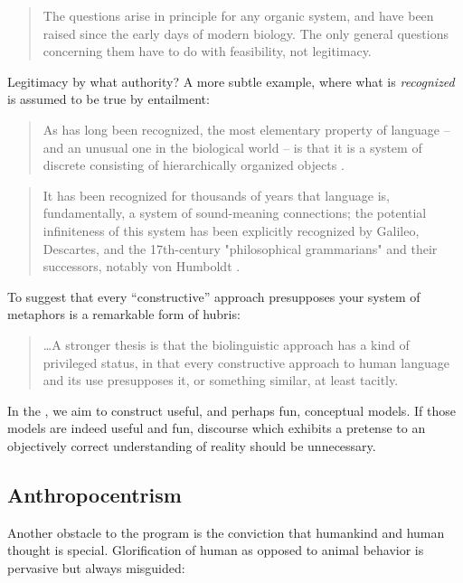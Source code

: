 \begin{quote} 
The questions arise in principle for any organic system, and have been raised since the early days of modern biology. The only general questions concerning them have to do with feasibility, not legitimacy. \citep[133]{Chomsky2008}
\end{quote}

Legitimacy by what authority? A more subtle example, where what is \textit{recognized} is assumed to be true by entailment:

\begin{quote} 
As has long been recognized, the most elementary property of language – and an unusual one in the biological world – is that it is a system of discrete  consisting of hierarchically organized objects \citep[134]{Chomsky2008}.
\end{quote}

\begin{quote} 
It has been recognized for thousands of years that language is, fundamentally, a system of sound-meaning connections; the potential infiniteness of this system has been explicitly recognized by Galileo, Descartes, and the 17th-century "philosophical grammarians" and their successors, notably von Humboldt \citep{HauserEtAl2002}.
\end{quote}

To suggest that every “constructive” approach presupposes your system of metaphors is a remarkable form of hubris:

\begin{quote} 
…A stronger thesis is that the biolinguistic approach has a kind of privileged status, in that every constructive approach to human language and its use presupposes it, or something similar, at least tacitly. \citep{Chomsky2001a}
\end{quote}

  In the , we aim to construct useful, and perhaps fun, conceptual models. If those models are indeed useful and fun, discourse which exhibits a pretense to an objectively correct understanding of reality should be unnecessary.

\subsection{Anthropocentrism}

Another obstacle to the  program is the conviction that humankind and human thought is special. Glorification of human as opposed to animal behavior is pervasive but always misguided:

